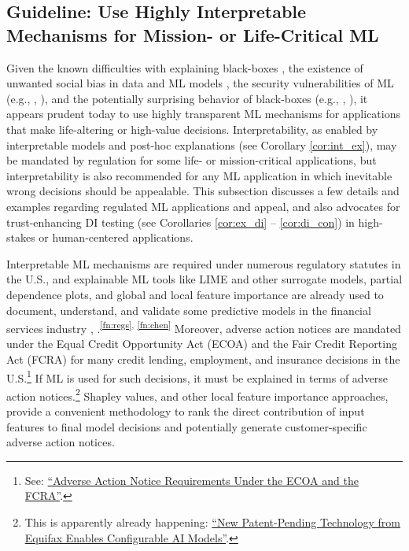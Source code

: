 \documentclass{article}
\begin{document}
\subsection{Guideline: Use Highly Interpretable Mechanisms for Mission- or Life-Critical ML} \label{sec:white_box}

Given the known difficulties with explaining black-boxes \cite{please_stop}, the existence of unwanted social bias in data and ML models \cite{fairmlbook}, the security vulnerabilities of ML (e.g., \citet{membership_inference}, \citet{model_stealing}), and the potentially surprising behavior of black-boxes (e.g., \citet{easily_fooled}, \citet{intriguing_properties}), it appears prudent today to use highly transparent ML mechanisms for  applications that make life-altering or high-value decisions. Interpretability, as enabled by interpretable models and post-hoc explanations (see Corollary \ref{cor:int_ex}), may be mandated by regulation for some life- or mission-critical applications, but interpretability is also recommended for any ML application in which inevitable wrong decisions should be appealable. This subsection discusses a few details and examples regarding regulated ML applications and appeal, and also advocates for trust-enhancing DI testing (see Corollaries \ref{cor:ex_di} -- \ref{cor:di_con}) in high-stakes or human-centered applications.  

Interpretable ML mechanisms are required under numerous regulatory statutes in the U.S., and explainable ML tools like LIME and other surrogate models, partial dependence plots, and global and local feature importance are already used to document, understand, and validate some predictive models in the financial services industry \cite{lime-sup}, \cite{wf_xnn}.\textsuperscript{\ref{fn:regs}, \ref{fn:chen}} Moreover, adverse action notices are mandated under the Equal Credit Opportunity Act (ECOA) and the Fair Credit Reporting Act (FCRA) for many credit lending, employment, and insurance decisions in the U.S.\footnote{\scriptsize{See: \href{https://consumercomplianceoutlook.org/2013/second-quarter/adverse-action-notice-requirements-under-ecoa-fcra/}{``Adverse Action Notice Requirements Under the ECOA and the FCRA''}.}} If ML is used for such decisions, it must be explained in terms of adverse action notices.\footnote{\scriptsize{This is apparently already happening: \href{https://www.prnewswire.com/news-releases/new-patent-pending-technology-from-equifax-enables-configurable-ai-models-300701153.html}{``New Patent-Pending Technology from Equifax Enables Configurable AI Models''}.}} Shapley values, and other local feature importance approaches, provide a convenient methodology to rank the direct contribution of input features to final model decisions and potentially generate customer-specific adverse action notices. 
\end{document}
